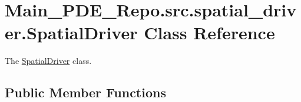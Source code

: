 \hypertarget{classMain__PDE__Repo_1_1src_1_1spatial__driver_1_1SpatialDriver}{}\section{Main\+\_\+\+P\+D\+E\+\_\+\+Repo.\+src.\+spatial\+\_\+driver.\+Spatial\+Driver Class Reference}
\label{classMain__PDE__Repo_1_1src_1_1spatial__driver_1_1SpatialDriver}


The \hyperlink{classMain__PDE__Repo_1_1src_1_1spatial__driver_1_1SpatialDriver}{Spatial\+Driver} class.  


\subsection*{Public Member Functions}
